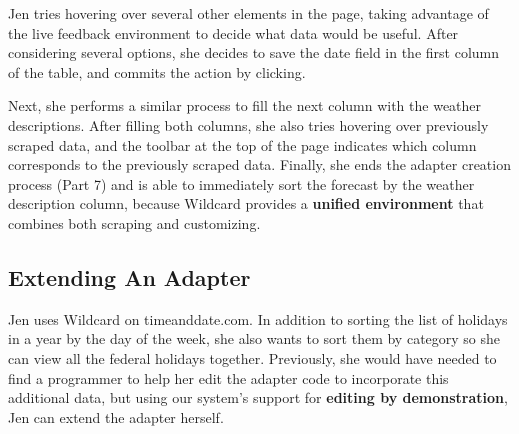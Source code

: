 \documentclass[sigconf,10pt]{acmart}
\begin{document}
Jen tries hovering over several other elements in the page, taking
advantage of the live feedback environment to decide what data would be
useful. After considering several options, she decides to save the date
field in the first column of the table, and commits the action by
clicking.

Next, she performs a similar process to fill the next column with the
weather descriptions. After filling both columns, she also tries
hovering over previously scraped data, and the toolbar at the top of the
page indicates which column corresponds to the previously scraped data.
Finally, she ends the adapter creation process (Part 7) and is able to
immediately sort the forecast by the weather description column, because
Wildcard provides a \textbf{unified environment} that combines both
scraping and customizing.

\hypertarget{extending-an-adapter}{%
\subsection{Extending An Adapter}\label{extending-an-adapter}}

Jen uses Wildcard on timeanddate.com. In addition to sorting the list of
holidays in a year by the day of the week, she also wants to sort them
by category so she can view all the federal holidays together.
Previously, she would have needed to find a programmer to help her edit
the adapter code to incorporate this additional data, but using our
system's support for \textbf{editing by demonstration}, Jen can extend
the adapter herself.
\end{document}
